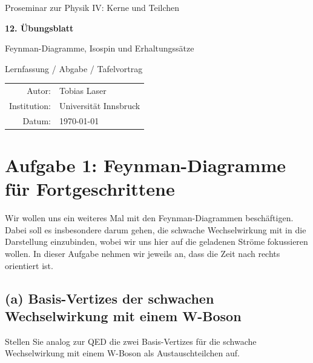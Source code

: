 \documentclass[11pt,a4paper]{scrartcl}
\newcommand{\CourseTitle}{Proseminar zur Physik IV: Kerne und Teilchen}
\newcommand{\DocumentKind}{Lernfassung / Abgabe / Tafelvortrag}
\newcommand{\DocumentTitle}{12. Übungsblatt}
\newcommand{\DocumentSubtitle}{Feynman-Diagramme, Isospin und Erhaltungssätze}
\newcommand{\AuthorName}{Tobias Laser}
\newcommand{\InstitutionName}{Universität Innsbruck}
\newcommand{\SubmissionDate}{\today}
\newcommand{\makeuniversitytitle}{%
    \begin{titlepage}
        \centering
        \vspace*{2cm}
        {\Large \CourseTitle\par}
        \vspace{1.2cm}
        {\huge\bfseries \DocumentTitle\par}
        \vspace{0.4cm}
        {\Large \DocumentSubtitle\par}
        \vspace{1.2cm}
        {\large \DocumentKind\par}
        \vfill
        \begin{tabular}{rl}
            Autor: & \AuthorName\\
            Institution: & \InstitutionName\\
            Datum: & \SubmissionDate
        \end{tabular}
        \vspace*{2cm}
    \end{titlepage}%
}
\begin{document}
\makeuniversitytitle
\tableofcontents
\newpage

\section{Aufgabe 1: Feynman-Diagramme für Fortgeschrittene}

Wir wollen uns ein weiteres Mal mit den Feynman-Diagrammen beschäftigen. Dabei soll es insbesondere darum gehen, die schwache Wechselwirkung mit in die Darstellung einzubinden, wobei wir uns hier auf die geladenen Ströme fokussieren wollen. In dieser Aufgabe nehmen wir jeweils an, dass die Zeit nach rechts orientiert ist.

\subsection*{(a) Basis-Vertizes der schwachen Wechselwirkung mit einem W-Boson}

Stellen Sie analog zur QED die zwei Basis-Vertizes für die schwache Wechselwirkung mit einem W-Boson als Austauschteilchen auf.
\end{document}
